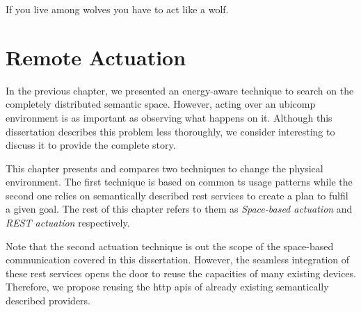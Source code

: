 
\begin{savequote}[50mm]
If you live among wolves you have to act like a wolf.
\end{savequote}


\chapter{Remote Actuation}
\label{cha:actuate}


\newcommand{\restdesc}{\emph{RESTdesc}}
\newcommand{\spaceActuation}{\emph{Space-based actuation}}
\newcommand{\restActuation}{\emph{REST actuation}}
\newcommand{\hybridActuation}{\emph{Hybrid actuation}}


\ifpdf
    \graphicspath{{\pathchapsix/figures/PNG/}{\pathchapsix/figures/PDF/}{\pathchapsix/figures/JPG/}{\pathchapsix/figures/}}
\else
    \graphicspath{{\pathchapsix/figures/EPS/}{\pathchapsix/figures/}}
\fi




In the previous chapter, we presented an energy-aware technique to search on the completely distributed semantic space. %
However, acting over an \ac{ubicomp} environment is as important as observing what happens on it.
Although this dissertation describes this problem less thoroughly, we consider interesting to discuss it to provide the complete story. %

\bigskip

This chapter presents and compares two techniques to change the physical environment.
The first technique is based on common \ac{ts} usage patterns while the second one relies on semantically described \ac{rest} services to create a plan to fulfil a given goal.
The rest of this chapter refers to them as \spaceActuation{} and \restActuation{} respectively.

Note that the second actuation technique is out the scope of the space-based communication covered in this dissertation.
However, the seamless integration of these \ac{rest} services opens the door to reuse the capacities of many existing devices.
Therefore, we propose reusing the \acs{http} \acsp{api} of already existing semantically described providers.

